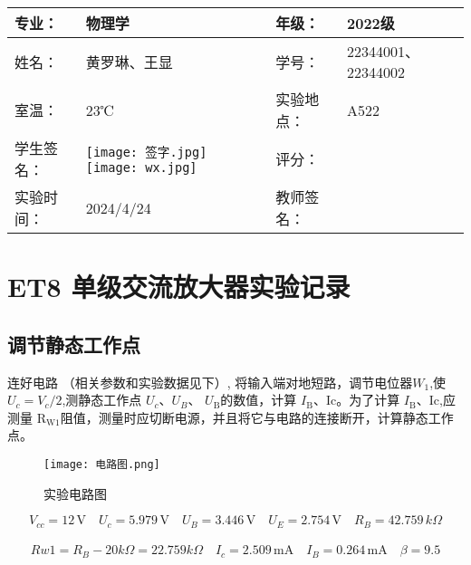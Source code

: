 \documentclass[dvipsnames, svgnames,a4paper,11pt]{article}
\begin{document}
	
	
	
	
	
	\clearpage
	
	\begin{table}
		\renewcommand\arraystretch{1.7}
		\centering
		\begin{tabularx}{\textwidth}{|X|X|X|X|}
			\hline
			专业： & 物理学 & 年级： & 2022级 \\
			\hline
			姓名： & 黄罗琳、王显 & 学号： &22344001、22344002 \\
			\hline
			室温： & 23℃ & 实验地点： & A522 \\
			\hline
			学生签名：& \texttt{[image: 签字.jpg]} \texttt{[image: wx.jpg]}  & 评分： &\\
			\hline
			实验时间：& 2024/4/24 & 教师签名：&\\
			\hline
		\end{tabularx}
	\end{table}
	
	\section{ET8 单级交流放大器\quad\heiti 实验记录}
	
	\subsection{调节静态工作点}
	
	
	连好电路 （相关参数和实验数据见下）, 将输入端对地短路，调节电位器$W_1$,使 $U_c=V_c/2$,测静态工作点 $U_c、U_B$、 $U_{\mathrm{B}}$的数值，计算 $I_\mathrm{B}$、Ic。为了计算 $I_\mathrm{B}$、Ic,应测量 R$_\mathrm{W1}$阻值，测量时应切断电源，并且将它与电路的连接断开，计算静态工作点。
	\begin{figure}[{H}]
		\centering
		\texttt{[image: 电路图.png]}
		\caption{实验电路图}
		\label{}
	\end{figure}
	$$
V_{cc} = 12 \, \mathrm{V} \quad 
U_c = 5.979 \, \mathrm{V} \quad 
U_B = 3.446 \, \mathrm{V} \quad 
U_E = 2.754 \, \mathrm{V} \quad 
R_B = 42.759 \,k\Omega $$\\$$
Rw1 = R_B - 20 k\Omega = 22.759 k\Omega \quad 
I_c = 2.509 \, \mathrm{mA} \quad 
I_B = 0.264 \, \mathrm{mA} \quad 
\beta = 9.5
$$
\end{document}

